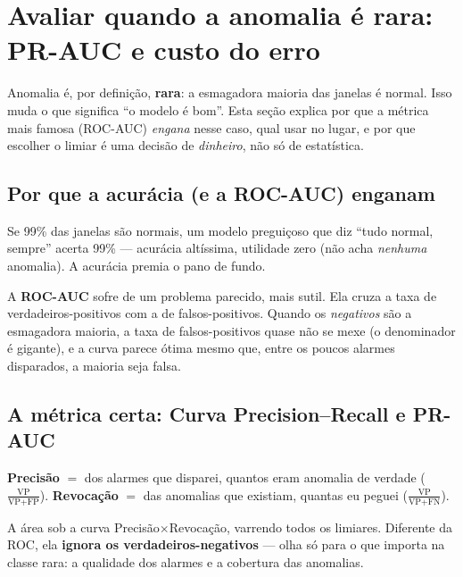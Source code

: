 \section{Avaliar quando a anomalia é rara: PR-AUC e custo do erro}
\label{sec:metricas-rara}

Anomalia é, por definição, \textbf{rara}: a esmagadora maioria das janelas é normal. Isso muda o que
significa ``o modelo é bom''. Esta seção explica por que a métrica mais famosa (ROC-AUC) \emph{engana}
nesse caso, qual usar no lugar, e por que escolher o limiar é uma decisão de \emph{dinheiro}, não só
de estatística.

\subsection{Por que a acurácia (e a ROC-AUC) enganam}
\label{sec:rara-roc}

\begin{intuicao}
Se 99\% das janelas são normais, um modelo preguiçoso que diz ``tudo normal, sempre'' acerta 99\% ---
acurácia altíssima, utilidade zero (não acha \emph{nenhuma} anomalia). A acurácia premia o pano de
fundo.
\end{intuicao}

A \textbf{ROC-AUC} sofre de um problema parecido, mais sutil. Ela cruza a taxa de verdadeiros-positivos
com a de falsos-positivos. Quando os \emph{negativos} são a esmagadora maioria, a taxa de falsos-positivos
quase não se mexe (o denominador é gigante), e a curva parece ótima mesmo que, entre os poucos alarmes
disparados, a maioria seja falsa.

\subsection{A métrica certa: Curva Precision--Recall e PR-AUC}
\label{sec:rara-pr}

\begin{definicao}
\textbf{Precisão} $=$ dos alarmes que disparei, quantos eram anomalia de verdade
($\frac{\text{VP}}{\text{VP}+\text{FP}}$). \textbf{Revocação} $=$ das anomalias que existiam, quantas
eu peguei ($\frac{\text{VP}}{\text{VP}+\text{FN}}$).
\end{definicao}

\begin{definicao}[PR-AUC]
A área sob a curva Precisão$\times$Revocação, varrendo todos os limiares. Diferente da ROC, ela
\textbf{ignora os verdadeiros-negativos} --- olha só para o que importa na classe rara: a qualidade
dos alarmes e a cobertura das anomalias.
\end{definicao}

